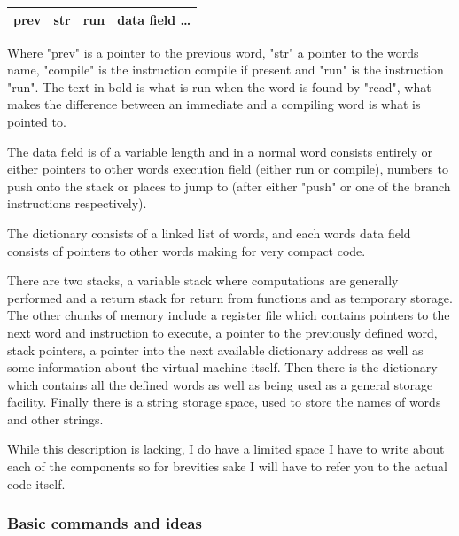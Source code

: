 \documentclass	[a4paper, 10pt]	{article}
\begin{document}
      \begin{center}
        \begin{tabular}{l | c | c | r }
          \hline
          prev & str & \textbf{run} & data field \ldots \\
          \hline
        \end{tabular}
      \end{center}

      Where "prev" is a pointer to the previous word, "str" a pointer to the words
      name, "compile" is the instruction compile if present and "run" is the instruction
      "run". The text in bold is what is run when the word is found by "read", what makes
      the difference between an immediate and a compiling word is what is pointed to.

      The data field is of a variable length and in a normal word consists entirely or
      either pointers to other words execution field (either run or compile), numbers
      to push onto the stack or places to jump to (after either "push" or one of the
      branch instructions respectively).

      The dictionary consists of a linked list of words, and each words data field
      consists of pointers to other words making for very compact code.

      There are two stacks, a variable stack where computations are generally performed
      and a return stack for return from functions and as temporary storage. The other
      chunks of memory include a register file which contains pointers to the next
      word and instruction to execute, a pointer to the previously defined word, stack
      pointers, a pointer into the next available dictionary address as well as some
      information about the virtual machine itself. Then there is the dictionary which
      contains all the defined words as well as being used as a general storage facility.
      Finally there is a string storage space, used to store the names of words and
      other strings.

      While this description is lacking, I do have a limited space I have to write about
      each of the components so for brevities sake I will have to refer you to the
      actual code itself.
       
      \subsubsection{Basic commands and ideas}
\end{document}
